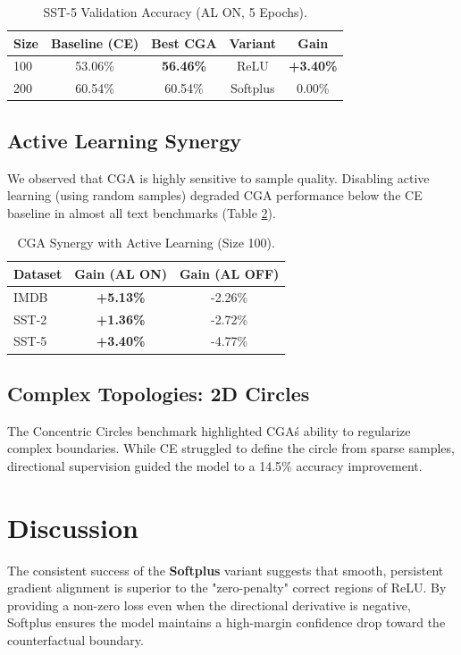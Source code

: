 \documentclass[sigconf,anonymous]{aamas}
\begin{document}
\begin{table}[h]
\centering
\caption{SST-5 Validation Accuracy (AL ON, 5 Epochs).}
\label{tab:sst5_results}
\begin{tabular}{lcccc}
\toprule
\textbf{Size} & \textbf{Baseline (CE)} & \textbf{Best CGA} & \textbf{Variant} & \textbf{Gain} \\
\midrule
100 & 53.06\% & \textbf{56.46\%} & ReLU & \textbf{+3.40\%} \\
200 & 60.54\% & 60.54\% & Softplus & 0.00\% \\
\bottomrule
\end{tabular}
\end{table}

\subsection{Active Learning Synergy}
We observed that CGA is highly sensitive to sample quality. Disabling active learning (using random samples) degraded CGA performance below the CE baseline in almost all text benchmarks (Table \ref{tab:al_synergy}).

\begin{table}[h]
\centering
\caption{CGA Synergy with Active Learning (Size 100).}
\label{tab:al_synergy}
\begin{tabular}{lcc}
\toprule
\textbf{Dataset} & \textbf{Gain (AL ON)} & \textbf{Gain (AL OFF)} \\
\midrule
IMDB & \textbf{+5.13\%} & -2.26\% \\
SST-2 & \textbf{+1.36\%} & -2.72\% \\
SST-5 & \textbf{+3.40\%} & -4.77\% \\
\bottomrule
\end{tabular}
\end{table}

\subsection{Complex Topologies: 2D Circles}
The Concentric Circles benchmark highlighted CGA\'s ability to regularize complex boundaries. While CE struggled to define the circle from sparse samples, directional supervision guided the model to a 14.5\% accuracy improvement.

\section{Discussion}
\label{sec:discussion}
The consistent success of the \textbf{Softplus} variant suggests that smooth, persistent gradient alignment is superior to the "zero-penalty" correct regions of ReLU. By providing a non-zero loss even when the directional derivative is negative, Softplus ensures the model maintains a high-margin confidence drop toward the counterfactual boundary.
\end{document}
